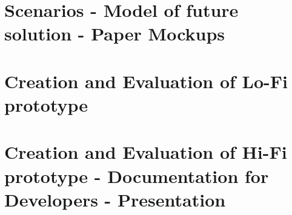 \documentclass[11pt]{report}
\begin{document}
\chapterfont{\LARGE \centering}
\chaptertitlefont{\Large \centering}
\chapter{Scenarios - Model of future solution - Paper Mockups}


\chapterfont{\LARGE \centering}
\chaptertitlefont{\Large \centering}
\chapter{Creation and Evaluation of  Lo-Fi prototype}


\chapterfont{\LARGE \centering}
\chaptertitlefont{\Large \centering}
\chapter{Creation and Evaluation of  Hi-Fi prototype - Documentation for Developers - Presentation}

\printbibliography
\end{document}
